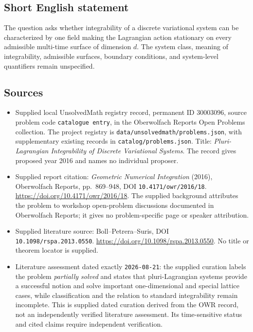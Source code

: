 \documentclass[11pt]{article}
\begin{document}
\subsection{Short English statement}
The question asks whether integrability of a discrete variational system can be characterized by one field making the Lagrangian action stationary on every admissible multi-time surface of dimension \(d\). The system class, meaning of integrability, admissible surfaces, boundary conditions, and system-level quantifiers remain unspecified.
\subsection{Sources}
\begin{itemize}
\item Supplied local UnsolvedMath registry record, permanent ID \(30003096\), source problem code \texttt{catalogue entry}, in the Oberwolfach Reports Open Problems collection. The project registry is \texttt{data/unsolvedmath/problems.json}, with supplementary existing records in \texttt{catalog/problems.json}. Title: \emph{Pluri-Lagrangian Integrability of Discrete Variational Systems}. The record gives proposed year 2016 and names no individual proposer.
\item Supplied report citation: \emph{Geometric Numerical Integration} (2016), Oberwolfach Reports, pp.\ 869--948, DOI \texttt{10.4171/owr/2016/18}. \url{https://doi.org/10.4171/owr/2016/18}. The supplied background attributes the problem to workshop open-problem discussions documented in Oberwolfach Reports; it gives no problem-specific page or speaker attribution.
\item Supplied literature source: Boll--Petrera--Suris, DOI \texttt{10.1098/rspa.2013.0550}. \url{https://doi.org/10.1098/rspa.2013.0550}. No title or theorem locator is supplied.
\item Literature assessment dated exactly \texttt{2026-08-21}: the supplied curation labels the problem \emph{partially solved} and states that pluri-Lagrangian systems provide a successful notion and solve important one-dimensional and special lattice cases, while classification and the relation to standard integrability remain incomplete. This is supplied dated curation derived from the OWR record, not an independently verified literature assessment. Its time-sensitive status and cited claims require independent verification.
\end{itemize}
\end{document}
